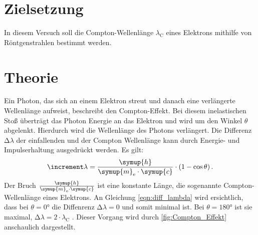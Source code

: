 \section{Zielsetzung}
In diesem Versuch soll die Compton-Wellenlänge $\lambda_\text{C}$ eines Elektrons mithilfe von Röntgenstrahlen bestimmt werden.

\section{Theorie}
\label{sec:Theorie}
Ein Photon, das sich an einem Elektron streut und danach eine verlängerte Wellenlänge aufweist, beschreibt den Compton-Effekt.
Bei diesem inelastischen Stoß überträgt das Photon Energie an das Elektron und wird um den Winkel $\theta$ abgelenkt.
Hierdurch wird die Wellenlänge des Photons verlängert.
Die Differenz $\increment \lambda$ der einfallenden und der Compton Wellenlänge kann durch Energie- und Impulserhaltung ausgedrückt werden.
Es gilt:
\begin{equation}\label{eqn:diff_lambda}
    \increment \lambda = \frac{\symup{h}}{\symup{m}_\text{e} \cdot \symup{c}} \cdot (1 - \cos\theta) \, .
\end{equation}
Der Bruch $\frac{\symup{h}}{\symup{m}_\text{e} \cdot \symup{c}}$ ist eine konstante Länge, die sogenannte Compton-Wellenlänge eines Elektrons.
An Gleichung \eqref{eqn:diff_lambda} wird ersichtlich, dass bei $\theta = 0°$ die Diffenrenz $\increment \lambda = 0$ und somit minimal ist.
Bei $\theta = 180°$ ist sie maximal, $\increment \lambda = 2 \cdot \lambda_\text{C}$ .
Dieser Vorgang wird durch \autoref{fig:Compton_Effekt} anschaulich dargestellt.


